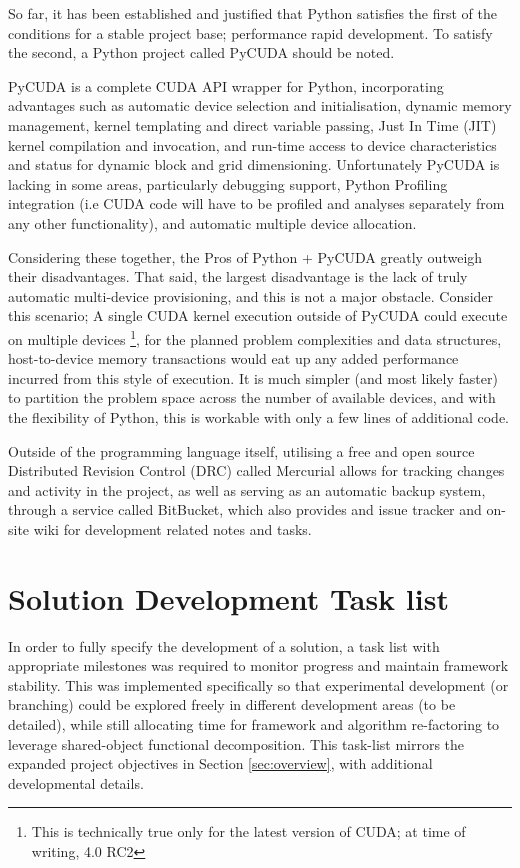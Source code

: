 So far, it has been established and justified that Python satisfies the first of the conditions for a stable project base; performance rapid development. To satisfy the second, a Python project called PyCUDA should be noted. 

PyCUDA is a complete CUDA API wrapper for Python, incorporating advantages such as automatic device selection and initialisation, dynamic memory management, kernel templating and direct variable passing, Just In Time (JIT) kernel compilation and invocation, and run-time access to device characteristics and status for dynamic block and grid dimensioning. Unfortunately PyCUDA is lacking in some areas, particularly debugging support, Python Profiling integration (i.e CUDA code will have to be profiled and analyses separately from any other functionality), and automatic multiple device allocation.

Considering these together, the Pros of Python + PyCUDA greatly outweigh their disadvantages. That said, the largest disadvantage is the lack of truly automatic multi-device provisioning, and this is not a major obstacle. Consider this scenario; A single CUDA kernel execution outside of PyCUDA could execute on multiple devices \footnote{This is technically true only for the latest version of CUDA; at time of writing, 4.0 RC2}, for the planned problem complexities and  data structures, host-to-device memory transactions would eat up any added performance incurred from this style of execution. It is much simpler (and most likely faster) to partition the problem space across the number of available devices, and with the flexibility of Python, this is workable with only a few lines of additional code.

Outside of the programming language itself, utilising a free and open source Distributed Revision Control (DRC) called Mercurial allows for tracking changes and activity in the project, as well as serving as an automatic backup system, through a service called BitBucket, which also provides and issue tracker and on-site wiki for development related notes and tasks.

\section{Solution Development Task list}
In order to fully specify the development of a solution, a task list with appropriate milestones was required to monitor progress and maintain framework stability. This was implemented specifically so that experimental development (or branching) could be explored freely in different development areas (to be detailed), while still allocating time for framework and algorithm re-factoring to leverage shared-object functional decomposition. This task-list mirrors the expanded project objectives in Section \ref{sec:overview}, with additional developmental details.

